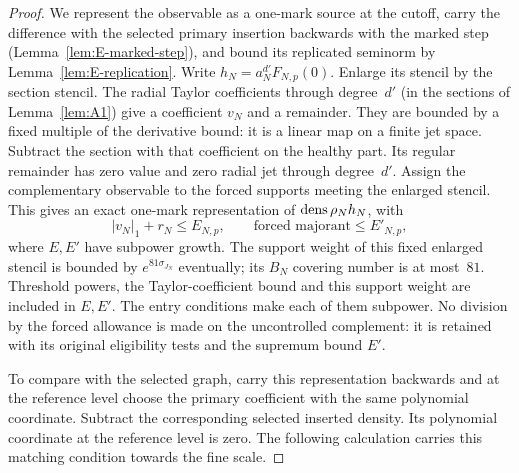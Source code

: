 \begin{proof}
We represent the observable as a one-mark source at the cutoff, carry the difference with the selected primary insertion backwards with the marked step (Lemma~\ref{lem:E-marked-step}), and bound its replicated seminorm by Lemma~\ref{lem:E-replication}. Write $h_N=a_N^{d'}F_{N,p}(0)$. Enlarge its stencil by the section stencil. The radial Taylor coefficients through degree~$d'$ (in the sections of Lemma~\ref{lem:A1}) give a coefficient $v_N$ and a remainder. They are bounded by a fixed multiple of the derivative bound: it is a linear map on a finite jet space. Subtract the section with that coefficient on the healthy part. Its regular remainder has zero value and zero radial jet through degree~$d'$. Assign the complementary observable to the forced supports meeting the enlarged stencil. This gives an exact one-mark representation of $\operatorname{dens}\rho_N h_N$, with
\begin{equation}\label{eq:E-local-start}
 |v_N|_1+r_N\le E_{N,p},\qquad
 \text{forced majorant}\le E'_{N,p},
\end{equation}
where $E,E'$ have subpower growth. The support weight of this fixed enlarged stencil is bounded by $e^{81\sigma_{J_N}}$ eventually; its $B_N$ covering number is at most~$81$. Threshold powers, the Taylor-coefficient bound and this support weight are included in $E,E'$. The entry conditions make each of them subpower. No division by the forced allowance is made on the uncontrolled complement: it is retained with its original eligibility tests and the supremum bound $E'$.

To compare with the selected graph, carry this representation backwards and at the reference level choose the primary coefficient with the same polynomial coordinate. Subtract the corresponding selected inserted density. Its polynomial coordinate at the reference level is zero. The following calculation carries this matching condition towards the fine scale.


\end{proof}
